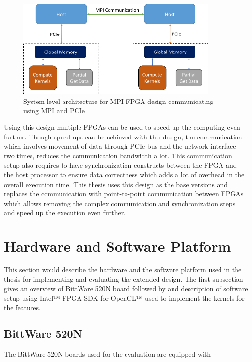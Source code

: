 \begin{figure}[h]%
    \centering
    \includegraphics[width=0.9\textwidth]{images/mpi_fpga}
    \caption{System level architecture for MPI FPGA design communicating using MPI and PCIe}
    \label{fig:mpi_fpga}
\end{figure}

Using this design multiple FPGAs can be used to speed up the computing even further.
Though speed ups can be achieved with this design, the communication which involves
movement of data through \ac{PCIe} bus and the network interface two times,
reduces the communication bandwidth a lot. This communication setup also
requires to have synchronization constructs between the FPGA and the host
processor to ensure data correctness which adds a lot of overhead in the overall
execution time. This thesis uses this design as the base versions and replaces
the communication with point-to-point communication between FPGAs which allows
removing the complex communication and synchronization steps and speed up the
execution even further.

\section{Hardware and Software Platform}

This section would describe the hardware and the software platform used in the
thesis for implementing and evaluating the extended design. The first subsection
gives an overview of BittWare 520N board followed by and description of software
setup using Intel™ FPGA SDK for OpenCL™ used to implement the kernels for the
features.

\subsection{BittWare 520N}

The BittWare 520N boards used for the evaluation are equipped with

